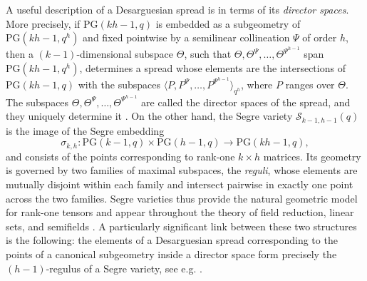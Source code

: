 \documentclass[11pt]{article}
\theoremstyle{definition}
\numberwithin{equation}{section}
\def\cS{\mathcal S}
\def\PG{\mathrm{PG}}
\begin{document}
A useful description of a Desarguesian spread is
in terms of its \emph{director spaces}.
More precisely, if $\PG(kh-1,q)$ is embedded as a subgeometry of
$\PG(kh-1,q^h)$ and fixed pointwise by a semilinear collineation $\Psi$ of order $h$,
then a $(k-1)$-dimensional subspace $\Theta$, such that $\Theta,\Theta^{\Psi},\ldots,\Theta^{\Psi^{h-1}}$ span $\PG(kh-1,q^h)$, determines a spread whose elements are the intersections of
$\PG(kh-1,q)$ with the subspaces
$\langle P,P^\Psi,\dots,P^{\Psi^{h-1}}\rangle_{q^h}$,
where $P$ ranges over $\Theta$.
The subspaces $\Theta,\Theta^\Psi,\dots,\Theta^{\Psi^{h-1}}$ are called the
director spaces of the spread, and they uniquely determine it
\cite{bader2011desarguesian}. On the other hand, the Segre variety $\cS_{k-1,h-1}(q)$ is the image of the Segre
embedding
\[
\sigma_{k,h}:\PG(k-1,q)\times \PG(h-1,q)\longrightarrow \PG(kh-1,q),
\]
and consists of the points corresponding to rank-one $k\times h$ matrices.
Its geometry is governed by two families of maximal subspaces, the \textit{reguli},
whose elements are mutually disjoint within each family and intersect pairwise
in exactly one point across the two families.
Segre varieties thus provide the natural geometric model for rank-one tensors
and appear throughout the theory of field reduction, linear sets, and
semifields
\cite{HirschfeldThas,Lavrauw2015,Lavrauw2014segre}. A particularly significant link between these two structures is the following:
the elements of a Desarguesian spread corresponding to the points of a
canonical subgeometry inside a director space form precisely the
$(h-1)$-regulus of a Segre variety, see e.g. \cite[Theorem 2.6]{Lavrauw2015}.
\end{document}
